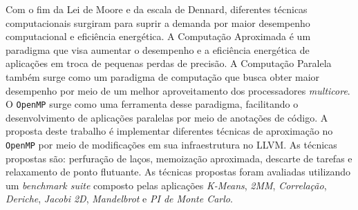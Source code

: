 \begin{resumoutfpr}
    Com o fim da Lei de Moore e da escala de Dennard, diferentes técnicas computacionais surgiram para suprir a demanda por maior desempenho computacional e eficiência energética. A Computação Aproximada é um paradigma que visa aumentar o desempenho e a eficiência energética de aplicações em troca de pequenas perdas de precisão. A Computação Paralela também surge como um paradigma de computação que busca obter maior desempenho por meio de um melhor aproveitamento dos processadores \textit{multicore}. O \texttt{OpenMP} surge como uma ferramenta desse paradigma, facilitando o desenvolvimento de aplicações paralelas por meio de anotações de código. A proposta deste trabalho é implementar diferentes técnicas de aproximação no \texttt{OpenMP} por meio de modificações em sua infraestrutura no LLVM. As técnicas propostas são: perfuração de laços, memoização aproximada, descarte de tarefas e relaxamento de ponto flutuante. As técnicas propostas foram avaliadas utilizando um \textit{benchmark suite} composto pelas aplicações \textit{K-Means}, \textit{2MM}, \textit{Correlação}, \textit{Deriche}, \textit{Jacobi 2D}, \textit{Mandelbrot} e \textit{PI de Monte Carlo}.
\end{resumoutfpr}

